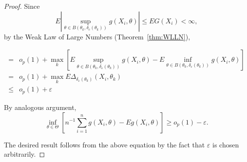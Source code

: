 \begin{proof}
	Since
	\begin{equation*}
		E\left|\sup_{\theta\in B\left(\theta_{k},\delta_{c}\left(\theta_{k}\right)\right)}g\left(X_{i},\theta\right)\right|\leq EG\left(X_{i}\right)<\infty,
	\end{equation*}
	by the Weak Law of Large Numbers (Theorem~\ref{thm:WLLN}),

	\begin{equation*}
		\begin{aligned}
			=    & o_{p}(1)+\max_{k}\left[E\sup_{\theta\in B\left(\theta_{k},\delta_{\varepsilon}\left(\theta_{k}\right)\right)}g\left(X_{i},\theta\right)-E\inf_{\theta\in B\left(\theta_{k},\delta_{\varepsilon}\left(\theta_{k}\right)\right)}g\left(X_{i},\theta\right)\right] \\
			=    & o_{p}(1)+\max_{k}E\Delta_{\delta_{\varepsilon}\left(\theta_{k}\right)}\left(X_{i},\theta_{k}\right)                                                                                                                                                             \\
			\leq & o_{p}(1)+\varepsilon
		\end{aligned}
	\end{equation*}

	By analogous argument,
	\begin{equation*}
		\inf_{\theta\in\Theta}\left[n^{-1}\sum_{i=1}^{n}g\left(X_{i},\theta\right)-Eg\left(X_{i},\theta\right)\right]\geq o_{p}(1)-\varepsilon.
	\end{equation*}

	The desired result follows from the above equation by the fact that $\varepsilon$ is chosen arbitrarily.
\end{proof}
